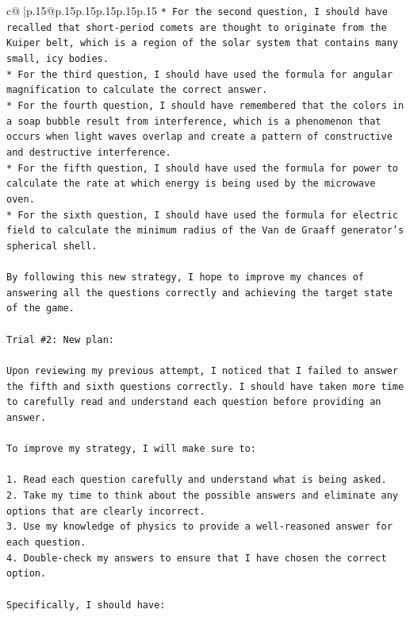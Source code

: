 \documentclass{article}
\begin{document}
{\begin{supertabular}{c@{$\;$}|p{.15\linewidth}@{}p{.15\linewidth}p{.15\linewidth}p{.15\linewidth}p{.15\linewidth}p{.15\linewidth}}
{{{\texttt{* For the second question, I should have recalled that short{-}period comets are thought to originate from the Kuiper belt, which is a region of the solar system that contains many small, icy bodies.} \\
\texttt{* For the third question, I should have used the formula for angular magnification to calculate the correct answer.} \\
\texttt{* For the fourth question, I should have remembered that the colors in a soap bubble result from interference, which is a phenomenon that occurs when light waves overlap and create a pattern of constructive and destructive interference.} \\
\texttt{* For the fifth question, I should have used the formula for power to calculate the rate at which energy is being used by the microwave oven.} \\
\texttt{* For the sixth question, I should have used the formula for electric field to calculate the minimum radius of the Van de Graaff generator's spherical shell.} \\
\\ 
\texttt{By following this new strategy, I hope to improve my chances of answering all the questions correctly and achieving the target state of the game.} \\
\\ 
\texttt{Trial \#2: New plan: } \\
\\ 
\texttt{Upon reviewing my previous attempt, I noticed that I failed to answer the fifth and sixth questions correctly. I should have taken more time to carefully read and understand each question before providing an answer. } \\
\\ 
\texttt{To improve my strategy, I will make sure to:} \\
\\ 
\texttt{1. Read each question carefully and understand what is being asked.} \\
\texttt{2. Take my time to think about the possible answers and eliminate any options that are clearly incorrect.} \\
\texttt{3. Use my knowledge of physics to provide a well{-}reasoned answer for each question.} \\
\texttt{4. Double{-}check my answers to ensure that I have chosen the correct option.} \\
\\ 
\texttt{Specifically, I should have:} \\
}}}
\end{supertabular}}
\end{document}
